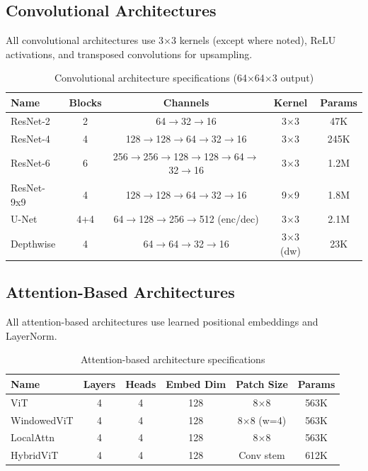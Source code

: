 \subsection{Convolutional Architectures}

All convolutional architectures use 3$\times$3 kernels (except where noted), ReLU activations, and transposed convolutions for upsampling.

\begin{table}[H]
\centering
\caption{Convolutional architecture specifications (64$\times$64$\times$3 output)}
\begin{tabular}{lcccc}
\toprule
Name & Blocks & Channels & Kernel & Params \\
\midrule
ResNet-2 & 2 & 64$\to$32$\to$16 & 3$\times$3 & 47K \\
ResNet-4 & 4 & 128$\to$128$\to$64$\to$32$\to$16 & 3$\times$3 & 245K \\
ResNet-6 & 6 & 256$\to$256$\to$128$\to$128$\to$64$\to$32$\to$16 & 3$\times$3 & 1.2M \\
ResNet-9x9 & 4 & 128$\to$128$\to$64$\to$32$\to$16 & 9$\times$9 & 1.8M \\
U-Net & 4+4 & 64$\to$128$\to$256$\to$512 (enc/dec) & 3$\times$3 & 2.1M \\
Depthwise & 4 & 64$\to$64$\to$32$\to$16 & 3$\times$3 (dw) & 23K \\
\bottomrule
\end{tabular}
\end{table}

\subsection{Attention-Based Architectures}

All attention-based architectures use learned positional embeddings and LayerNorm.

\begin{table}[H]
\centering
\caption{Attention-based architecture specifications}
\begin{tabular}{lccccc}
\toprule
Name & Layers & Heads & Embed Dim & Patch Size & Params \\
\midrule
ViT & 4 & 4 & 128 & 8$\times$8 & 563K \\
WindowedViT & 4 & 4 & 128 & 8$\times$8 (w=4) & 563K \\
LocalAttn & 4 & 4 & 128 & 8$\times$8 & 563K \\
HybridViT & 4 & 4 & 128 & Conv stem & 612K \\
\bottomrule
\end{tabular}
\end{table}

